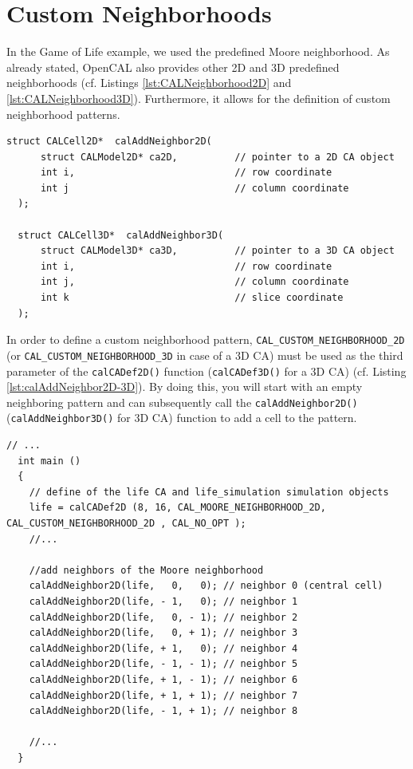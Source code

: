 \section{Custom Neighborhoods}\label{sec:CustomNeiughbourhoods}
In the Game of Life example, we used the predefined Moore
neighborhood. As already stated, OpenCAL also provides other 2D and 3D
predefined neighborhoods (cf. Listings \ref{lst:CALNeighborhood2D} and
\ref{lst:CALNeighborhood3D}). Furthermore, it allows for the
definition of custom neighborhood patterns.


\begin{lstlisting}[float, label=lst:calAddNeighbor2D-3D, caption=The calAddNeighbor2D() and calAddNeighbor3D() functions to define custom neighborhood patterns., numbers=none]
  struct CALCell2D*  calAddNeighbor2D(
      struct CALModel2D* ca2D,          // pointer to a 2D CA object
      int i,                            // row coordinate
      int j                             // column coordinate
  );

  struct CALCell3D*  calAddNeighbor3D(
      struct CALModel3D* ca3D,          // pointer to a 3D CA object
      int i,                            // row coordinate
      int j,                            // column coordinate
      int k                             // slice coordinate
  );
\end{lstlisting}


In order to define a custom neighborhood pattern,
\verb'CAL_CUSTOM_NEIGHBORHOOD_2D' (or
\verb'CAL_CUSTOM_NEIGHBORHOOD_3D' in case of a 3D CA) must be used as
the third parameter of the \verb'calCADef2D()' function
(\verb'calCADef3D()' for a 3D CA) (cf. Listing
\ref{lst:calAddNeighbor2D-3D}). By doing this, you will start with an
empty neighboring pattern and can subsequently call the
\verb'calAddNeighbor2D()' (\verb'calAddNeighbor3D()' for 3D CA)
function to add a cell to the pattern.

\begin{lstlisting}[float, label=lst:CustomMooreExample, caption=Example of custom neighbourhood pattern; the sequence of calls to the calAddNeighbor2D() function defines the Moore neighbourhood for the Game of Life CA., numbers=none]
  // ...
  int main ()
  {
    // define of the life CA and life_simulation simulation objects
    life = calCADef2D (8, 16, CAL_MOORE_NEIGHBORHOOD_2D, CAL_CUSTOM_NEIGHBORHOOD_2D , CAL_NO_OPT );
    //...

    //add neighbors of the Moore neighborhood
    calAddNeighbor2D(life,   0,   0); // neighbor 0 (central cell)
    calAddNeighbor2D(life, - 1,   0); // neighbor 1
    calAddNeighbor2D(life,   0, - 1); // neighbor 2
    calAddNeighbor2D(life,   0, + 1); // neighbor 3
    calAddNeighbor2D(life, + 1,   0); // neighbor 4
    calAddNeighbor2D(life, - 1, - 1); // neighbor 5
    calAddNeighbor2D(life, + 1, - 1); // neighbor 6
    calAddNeighbor2D(life, + 1, + 1); // neighbor 7
    calAddNeighbor2D(life, - 1, + 1); // neighbor 8

    //...
  }
\end{lstlisting}

